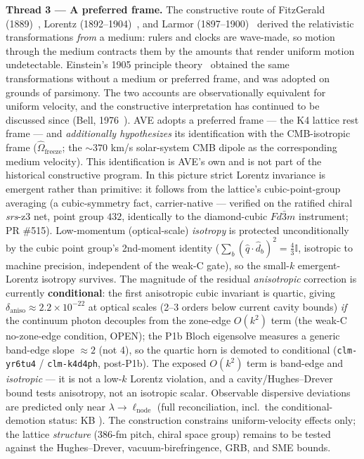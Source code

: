\vspace{0.5em}
\noindent \textbf{Thread 3 --- A preferred frame.} The constructive route of FitzGerald (1889)~\cite{fitzgerald1889ether}, Lorentz (1892--1904)~\cite{lorentz1892relative, lorentz1904electromagnetic}, and Larmor (1897--1900)~\cite{larmor1897dynamical, larmor1900aether} derived the relativistic transformations \emph{from} a medium: rulers and clocks are wave-made, so motion through the medium contracts them by the amounts that render uniform motion undetectable. Einstein's 1905 principle theory~\cite{einstein1905elektrodynamik} obtained the same transformations without a medium or preferred frame, and was adopted on grounds of parsimony. The two accounts are observationally equivalent for uniform velocity, and the constructive interpretation has continued to be discussed since (Bell, 1976~\cite{bell1976how}). AVE adopts a preferred frame --- the K4 lattice rest frame --- and \emph{additionally hypothesizes} its identification with the CMB-isotropic frame ($\hat\Omega_{\text{freeze}}$; the $\sim 370$ km/s solar-system CMB dipole as the corresponding medium velocity). This identification is AVE's own and is not part of the historical constructive program. In this picture strict Lorentz invariance is emergent rather than primitive: it follows from the lattice's cubic-point-group averaging (a cubic-symmetry fact, carrier-native --- verified on the ratified chiral \emph{srs}-z3 net, point group $432$, identically to the diamond-cubic $Fd\bar{3}m$ instrument; PR \#515). Low-momentum (optical-scale) \emph{isotropy} is protected unconditionally by the cubic point group's 2nd-moment identity ($\sum_b(\hat q\cdot\hat d_b)^2 = \tfrac43\mathbb{I}$, isotropic to machine precision, independent of the weak-C gate), so the small-$k$ emergent-Lorentz isotropy survives. The magnitude of the residual \emph{anisotropic} correction is currently \textbf{conditional}: the first anisotropic cubic invariant is quartic, giving $\delta_{\text{aniso}} \approx 2.2\times10^{-22}$ at optical scales (2--3 orders below current cavity bounds) \emph{if} the continuum photon decouples from the zone-edge $O(k^2)$ term (the weak-C no-zone-edge condition, OPEN); the P1b Bloch eigensolve measures a generic band-edge slope $\approx 2$ (not 4), so the quartic horn is demoted to conditional (\texttt{clm-yr6tu4} / \texttt{clm-k4d4ph}, post-P1b). The exposed $O(k^2)$ term is band-edge and \emph{isotropic} --- it is not a low-$k$ Lorentz violation, and a cavity/Hughes--Drever bound tests anisotropy, not an isotropic scalar. Observable dispersive deviations are predicted only near $\lambda \to \ell_{\text{node}}$ (full reconciliation, incl.\ the conditional-demotion status: KB ). The construction constrains uniform-velocity effects only; the lattice \emph{structure} (386-fm pitch, chiral space group) remains to be tested against the Hughes--Drever, vacuum-birefringence, GRB, and SME bounds.


